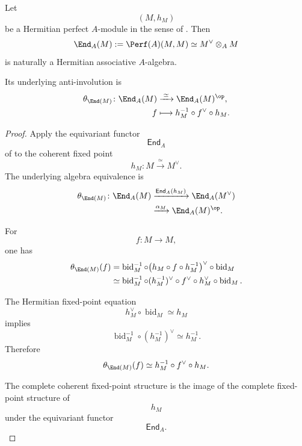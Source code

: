 \begin{proposition}
\label{prop:hermitian-endomorphism-algebra}
Let
\[
    (M,h_M)
\]
be a Hermitian perfect $A$-module in the sense of
. Then
\[
    \End_A(M)
    :=
    \Perf(A)(M,M)
    \simeq
    M^\vee\otimes_AM
\]
is naturally a Hermitian associative $A$-algebra.

Its underlying anti-involution is
\[
\begin{aligned}
    \theta_{\End(M)}
    \colon
    \End_A(M)
    &\xrightarrow{\;\simeq\;}
    \End_A(M)^{\op},
    \\
    f
    &\longmapsto
    h_M^{-1}\circ f^\vee\circ h_M.
\end{aligned}
\]
\end{proposition}

\begin{proof}
Apply the equivariant functor
\[
    \mathsf{End}_A
\]
of
to the coherent fixed point
\[
    h_M
    \colon
    M
    \xrightarrow{\;\simeq\;}
    M^\vee.
\]
The underlying algebra equivalence is
\[
\begin{aligned}
    \theta_{\End(M)}
    \colon
    \End_A(M)
    &\xrightarrow{\mathsf{End}_A(h_M)}
    \End_A(M^\vee)
    \\
    &\xrightarrow{\alpha_M}
    \End_A(M)^{\op}.
\end{aligned}
\]

For
\[
    f
    \colon
    M
    \longrightarrow
    M,
\]
one has
\[
\begin{aligned}
    \theta_{\End(M)}(f)
    &=
    \operatorname{bid}_M^{-1}
    \circ
    \bigl(
        h_M\circ f\circ h_M^{-1}
    \bigr)^\vee
    \circ
    \operatorname{bid}_M
    \\
    &\simeq
    \operatorname{bid}_M^{-1}
    \circ
    (h_M^{-1})^\vee
    \circ
    f^\vee
    \circ
    h_M^\vee
    \circ
    \operatorname{bid}_M.
\end{aligned}
\]

The Hermitian fixed-point equation
\[
    h_M^\vee\circ\operatorname{bid}_M
    \simeq
    h_M
\]
implies
\[
    \operatorname{bid}_M^{-1}
    \circ
    (h_M^{-1})^\vee
    \simeq
    h_M^{-1}.
\]
Therefore
\[
    \theta_{\End(M)}(f)
    \simeq
    h_M^{-1}\circ f^\vee\circ h_M.
\]

The complete coherent fixed-point structure is the image of the complete
fixed-point structure of
\[
    h_M
\]
under the equivariant functor
\[
    \mathsf{End}_A.
\]
\end{proof}


